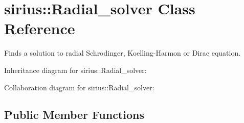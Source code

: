 \hypertarget{classsirius_1_1_radial__solver}{}\section{sirius\+:\+:Radial\+\_\+solver Class Reference}
\label{classsirius_1_1_radial__solver}


Finds a solution to radial Schrodinger, Koelling-\/\+Harmon or Dirac equation.  




Inheritance diagram for sirius\+:\+:Radial\+\_\+solver\+:


Collaboration diagram for sirius\+:\+:Radial\+\_\+solver\+:
\subsection*{Public Member Functions}
